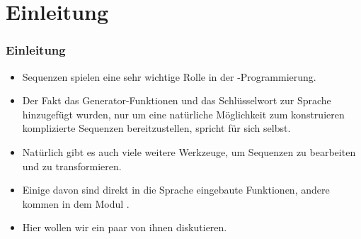 \documentclass[aspectratio=169,mathserif,notheorems]{beamer}%
\subtitle{40.~Operationen für Iteratoren}%
\begin{document}
%
%
\startPresentation%
%
\section{Einleitung}%
\begin{frame}[t]%
\frametitle{Einleitung}%
\begin{itemize}%
\item Sequenzen spielen eine sehr wichtige Rolle in der \python-Programmierung.%
%
\item<2-> Der Fakt das Generator-Funktionen und das Schlüsselwort  zur Sprache hinzugefügt wurden, nur um eine natürliche Möglichkeit zum konstruieren komplizierte Sequenzen bereitzustellen, spricht für sich selbst\cite{PEP255}.%
%
\item<3-> Natürlich gibt es auch viele weitere Werkzeuge, um Sequenzen zu bearbeiten und zu transformieren.%
%
\item<4-> Einige davon sind direkt in die Sprache eingebaute Funktionen, andere kommen in dem Modul \cite{PSF:P3D:TPSL:IFCIFEL}.%
%
\item<5-> Hier wollen wir ein paar von ihnen diskutieren.%
\end{itemize}
\end{frame}%
%
\end{document}
